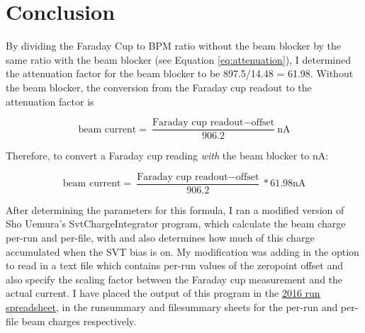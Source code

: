 \documentclass[11pt]{article}
\begin{document}
\section{Conclusion}
By dividing the Faraday Cup to BPM ratio without the beam blocker by the same ratio with the beam blocker (see Equation \ref{eq:attenuation}), I determined the attenuation factor for the beam blocker to be 897.5/14.48 = 61.98.  Without the beam blocker, the conversion from the Faraday cup readout to the attenuation factor is 

\begin{equation}\label{eq:without_blocker}
\textrm{beam current} = \frac{\textrm{Faraday cup readout}-\textrm{offset}}{906.2} \textrm{nA}
\end{equation}

Therefore, to convert a Faraday cup reading \textit{with} the beam blocker to nA:

\begin{equation}\label{eq:with_blocker}
\textrm{beam current} = \frac{\textrm{Faraday cup readout}-\textrm{offset}}{906.2}*61.98 \textrm{nA}
\end{equation} 

After determining the parameters for this formula, I ran a modified version of Sho Uemura's SvtChargeIntegrator program, which calculate the beam charge per-run and per-file, with and also determines how much of this charge accumulated when the  SVT bias is on.   My modification was adding in the option to read in a text file which contains per-run values of the zeropoint offset and also specify the scaling factor between the Faraday cup measurement and the actual current.  I have placed the output of this program in the \href{https://docs.google.com/spreadsheets/d/1X_TfOQyQBv9Ja1IQ5LYImk0sd00eN-d4zzkCwn-CSUM/edit#gid=43855609}{\underline{2016 run spreadsheet}}, in the runsummary and filesummary sheets for the per-run and per-file beam charges respectively.  
\end{document}
